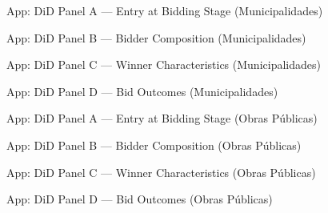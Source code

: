 \documentclass[10pt,aspectratio=169]{beamer}
\begin{document}
\begin{frame}{App: DiD Panel A --- Entry at Bidding Stage (Municipalidades)}
\small
\medskip

\end{frame}


\begin{frame}{App: DiD Panel B --- Bidder Composition (Municipalidades)}
\small
\medskip

\end{frame}


\begin{frame}{App: DiD Panel C --- Winner Characteristics (Municipalidades)}
\small
\medskip

\end{frame}


\begin{frame}{App: DiD Panel D --- Bid Outcomes (Municipalidades)}
\small
\medskip

\end{frame}



\begin{frame}{App: DiD Panel A --- Entry at Bidding Stage (Obras Públicas)}
\small
\medskip

\end{frame}


\begin{frame}{App: DiD Panel B --- Bidder Composition (Obras Públicas)}
\small
\medskip

\end{frame}


\begin{frame}{App: DiD Panel C --- Winner Characteristics (Obras Públicas)}
\small
\medskip

\end{frame}


\begin{frame}{App: DiD Panel D --- Bid Outcomes (Obras Públicas)}
\small
\medskip

\end{frame}


\end{document}
